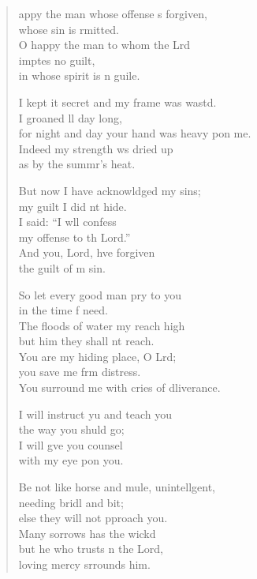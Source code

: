 \settowidth{\versewidth}{for night and day your hand was heavy upon me.}
\begin{verse}%
  \begin{patverse}
appy the man whose offense \pointup{\i}s forgiven,\Med\\
whose sin is rmitted.\\
O happy the man to whom the Lrd\Flex\\
imptes no guilt,\Med\\
in whose spirit is n guile.

I kept it secret and my frame was wastd.\Flex\\
I groaned ll day long,\Med\\
for night and day your hand was heavy pon me.\\
Indeed my strength ws dried up\Med\\
as by the summr’s heat.

But now I have acknowldged my sins;\Med\\
my guilt I did nt hide.\\
I said: “I w\pointup{\i}ll confess\Med\\
my offense to th Lord.”\\
And you, Lord, hve forgiven\Med\\
the guilt of m sin.

So let every good man pry to you\Med\\
in the time f need.\\
The floods of water my reach high\Med\\
but him they shall nt reach.\\
You are my hiding place, O Lrd;\Flex\\
you save me frm distress.\Med\\
You surround me with cries of dliverance.

I will instruct yu and teach you\Med\\
the way you shuld go;\\
I will g\pointup{\i}ve you counsel\Med\\
with my eye pon you.

Be not like horse and mule, unintell\pointup{\i}gent,\Flex\\
needing bridl and bit;\Med\\
else they will not pproach you.\Med\\
Many sorrows has the wickd\\
but he who trusts \pointup{\i}n the Lord,\Med\\
loving mercy srrounds him.


\end{patverse}
\end{verse}
